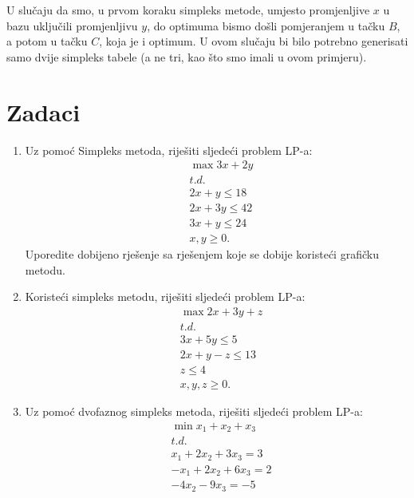 \documentclass[a4paper, utf8, 11pt, colorlinks]{book}
\theoremstyle{definition}
\begin{document}
U slučaju da smo, u prvom koraku simpleks metode, umjesto promjenljive $x$ u bazu uključili promjenljivu $y$, do optimuma bismo došli pomjeranjem u tačku $B$, a potom u tačku $C$, koja je i optimum. U ovom slučaju bi bilo potrebno generisati samo dvije simpleks tabele (a ne tri, kao što smo imali u ovom primjeru).
\\
\section{Zadaci}
\begin{enumerate}
 \item Uz pomoć Simpleks metoda, riješiti sljedeći problem LP-a:%
 \begin{align*}
 	 &\max  3x + 2y \\
 	 & t.d. \\
 	 & 2x + y \leq 18 \\
 	 & 2x + 3y \leq 42 \\
 	 & 3x + y \leq 24 \\
 	 & x,y \geq 0.
 \end{align*} 
Uporedite dobijeno rješenje sa rješenjem koje se dobije 
koristeći grafičku metodu.
\item %
  Koristeći simpleks metodu, riješiti sljedeći problem LP-a:
 \begin{align*}
 	  &\max 2x + 3y + z \\
 	  &   {t.d.} \\
 	  & 3x + 5 y \leq 5 \\
 	  & 2x + y - z \leq 13 \\
 	  & z \leq 4 \\
 	  & x,y,z \geq 0.
 \end{align*}
\item Uz pomoć dvofaznog simpleks metoda, riješiti sljedeći problem LP-a:%
   \begin{align*}
   	    &\min  x_1 + x_2 + x_3 \\
   	    & {t.d.} \\
   	    & x_1 + 2 x_2 + 3 x_3 = 3 \\
   	    & -x_1 + 2 x_2 + 6 x_3 = 2 \\
   	    & - 4x_2 - 9 x_3 = -5 \\

\end{align*}
\end{enumerate}
\end{document}

